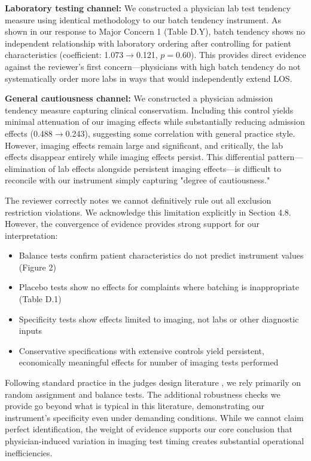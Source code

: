 \documentclass[11pt]{article}
\newcommand{\1}{\hbox{\rm 1\kern-.35em 1}}
\begin{document}
{\textbf{Laboratory testing channel:} We constructed a physician lab test tendency measure using identical methodology to our batch tendency instrument. As shown in our response to Major Concern 1 (Table D.Y), batch tendency shows no independent relationship with laboratory ordering after controlling for patient characteristics (coefficient: 1.073$\rightarrow$0.121, $p=0.60$). This provides direct evidence against the reviewer's first concern—physicians with high batch tendency do not systematically order more labs in ways that would independently extend LOS.

\textbf{General cautiousness channel:} We constructed a physician admission tendency measure capturing clinical conservatism. Including this control yields minimal attenuation of our imaging effects while substantially reducing admission effects (0.488$\rightarrow$0.243), suggesting some correlation with general practice style. However, imaging effects remain large and significant, and critically, the lab effects disappear entirely while imaging effects persist. This differential pattern—elimination of lab effects alongside persistent imaging effects—is difficult to reconcile with our instrument simply capturing "degree of cautiousness."

The reviewer correctly notes we cannot definitively rule out all exclusion restriction violations. We acknowledge this limitation explicitly in Section 4.8. However, the convergence of evidence provides strong support for our interpretation:

\begin{itemize}
\item Balance tests confirm patient characteristics do not predict instrument values (Figure 2)
\item Placebo tests show no effects for complaints where batching is inappropriate (Table D.1)
\item Specificity tests show effects limited to imaging, not labs or other diagnostic inputs
\item Conservative specifications with extensive controls yield persistent, economically meaningful effects for number of imaging tests performed
\end{itemize}

Following standard practice in the judges design literature \cite{dobbie2018effects, bhuller2020incarceration}, we rely primarily on random assignment and balance tests. The additional robustness checks we provide go beyond what is typical in this literature, demonstrating our instrument's specificity even under demanding conditions. While we cannot claim perfect identification, the weight of evidence supports our core conclusion that physician-induced variation in imaging test timing creates substantial operational inefficiencies.
\color{black}

}
\end{document}
